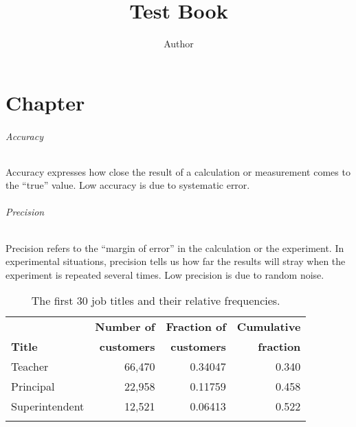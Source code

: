 \documentclass{book}
\title{Test Book}
\author{Author}
\newif\ifplastex
\begin{document}
\frontmatter

\ifplastex
    \usepackage{localdef}
    \maketitle

\else

\fi

\chapter{Chapter}

\newcommand{\tbl}[2]{#2\caption{#1}}

\begin{unnumlist}
\subparagraph{Accuracy}
\item {} Accuracy expresses how close the result of a calculation
  or measurement comes to the ``true'' value. Low accuracy is due to
  systematic error.
\subparagraph{Precision}  
\item Precision refers to the ``margin of error''  in the 
  calculation or the experiment. In experimental situations, precision
  tells us how far the results will stray when the experiment is 
  repeated several times. Low precision is due to random noise.
\end{unnumlist}


\begin{table}
\tbl{The first 30 job titles and their relative frequencies.\label{tbl:jobtitles}}{%
\begin{tabular}{lrrr}
\toprule
   & \textbf{Number of}
   & \textbf{Fraction of}
  & \textbf{Cumulative} \\
\textbf{Title} &  \textbf{customers} & \textbf{customers} & \textbf{fraction}\\
\colrule
Teacher \rule{0mm}{4mm}  & 66,470  &  0.34047   &   0.340 \\ 
Principal                & 22,958  &  0.11759   &   0.458 \\
Superintendent           & 12,521  &  0.06413   &   0.522 \\
\botrule
\end{tabular}}
\end{table}
\end{document}
